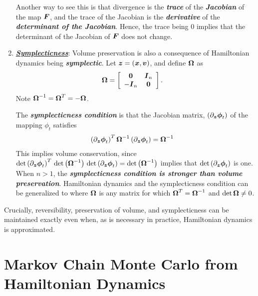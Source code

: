 \documentclass[11pt]{article}
\begin{document}
\begin{enumerate}
Another way to see this is that divergence is the \emph{\textbf{trace}} of the \emph{\textbf{Jacobian}} of the map $\boldsymbol{F}$, and the trace of the Jacobian is the \textbf{\emph{derivative}} of the \emph{\textbf{determinant of the Jacobian}}. Hence, the trace being $0$ implies that the determinant of the Jacobian of $\boldsymbol{F}$ does not change.

\item \underline{\emph{\textbf{Symplecticness}}}: Volume preservation is also a consequence of Hamiltonian dynamics being \emph{\textbf{symplectic}}. Let $\boldsymbol{z} = (\boldsymbol{x}, \boldsymbol{v})$, and define $\boldsymbol{\Omega}$ as 
\begin{align*}
\boldsymbol{\Omega} &= \left[\begin{array}{cc}
\boldsymbol{0} & \boldsymbol{I}_{n}  \\
-\boldsymbol{I}_{n}  & \boldsymbol{0}  
\end{array}\right].
\end{align*}  Note $\boldsymbol{\Omega}^{-1} = \boldsymbol{\Omega}^{T} = -\boldsymbol{\Omega}$. 

The \emph{\textbf{symplecticness condition}} is that the Jacobian matrix, $\left(\partial_{\boldsymbol{z}}\boldsymbol{\phi}_t\right)$ of the mapping $\phi_t$ satisfies
\begin{align}
\left(\partial_{\boldsymbol{z}}\boldsymbol{\phi}_t\right)^{T}\boldsymbol{\Omega}^{-1}\left(\partial_{\boldsymbol{z}}\boldsymbol{\phi}_t\right) &= \boldsymbol{\Omega}^{-1} \label{eqn: symplecticness}
\end{align} This implies volume conservation, since $\det\left(\partial_{\boldsymbol{z}}\boldsymbol{\phi}_t\right)^{T}\,\det\left(\boldsymbol{\Omega}^{-1}\right)\, \det\left(\partial_{\boldsymbol{z}}\boldsymbol{\phi}_t\right) = \det\left(\boldsymbol{\Omega}^{-1}\right)$ implies that
$\det{\left(\partial_{\boldsymbol{z}}\boldsymbol{\phi}_t\right)}$ is one. When $n > 1$, the \emph{\textbf{symplecticness condition is stronger than volume preservation}}. Hamiltonian dynamics and the symplecticness condition can be generalized to where $\boldsymbol{\Omega}$ is any matrix for which $\boldsymbol{\Omega}^{T} =  \boldsymbol{\Omega}^{-1}$ and $\det{\boldsymbol{\Omega}} \neq 0$.
\end{enumerate} 

Crucially, reversibility, preservation of volume, and symplecticness can be maintained exactly even when, as is necessary in practice, Hamiltonian dynamics is approximated.

\newpage
\section{Markov Chain Monte Carlo from Hamiltonian Dynamics}
\end{document}
